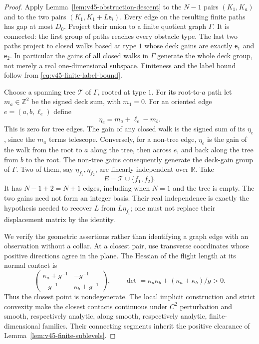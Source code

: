 \begin{proof}
Apply Lemma~\ref{lem:v45-obstruction-descent} to the $N-1$ pairs
$(K_1,K_a)$ and to the two pairs $(K_1,K_1+L\mathsf e_i)$.
Every edge on the resulting finite paths has gap at most $D_0$.
Project their union to a finite quotient graph $\Gamma$.  It is connected:
the first group of paths reaches every obstacle type.  The last two paths
project to closed walks based at type $1$ whose deck gains are exactly
$\mathsf e_1$ and $\mathsf e_2$.  In particular the gains of all closed
walks in $\Gamma$ generate the whole deck group, not merely a real
one-dimensional subspace.  Finiteness and the label bound follow from
\eqref{eq:v45-finite-label-bound}.

Choose a spanning tree $\mathcal T$ of $\Gamma$, rooted at type $1$.
For its root-to-$a$ path let $m_a\in\mathbb Z^2$ be the signed deck sum,
with $m_1=0$.  For an oriented edge $e=(a,b,\ell_e)$ define
\begin{equation}\label{eq:v45-fundamental-gain}
                       \eta_e=m_a+\ell_e-m_b.
\end{equation}
This is zero for tree edges.  The gain of any closed walk is the signed
sum of its $\eta_e$, since the $m_a$ terms telescope.  Conversely, for a
non-tree edge, $\eta_e$ is the gain of the walk from the root to $a$ along
the tree, then across $e$, and back along the tree from $b$ to the root.
The non-tree gains consequently generate the deck-gain group of $\Gamma$.
Two of them, say $\eta_{f_1},\eta_{f_2}$, are linearly independent over
$\mathbb R$.  Take
\[
                       E=\mathcal T\cup\{f_1,f_2\}.
\]
It has $N-1+2=N+1$ edges, including when $N=1$ and the tree is empty.
The two gains need not form an integer basis.  Their real independence is
exactly the hypothesis needed to recover $L$ from $L\eta_{f_i}$; one must
not replace their displacement matrix by the identity.

We verify the geometric assertions rather than identifying a graph edge
with an observation without a collar.  At a closest pair, use transverse
coordinates whose positive directions agree in the plane.  The Hessian of
the flight length at its normal contact is
\begin{equation}\label{eq:v45-contact-hessian}
 \begin{pmatrix}\kappa_a+g^{-1}&-g^{-1}\\-g^{-1}&\kappa_b+g^{-1}\end{pmatrix},
 \qquad
 \det=\kappa_a\kappa_b+(\kappa_a+\kappa_b)/g>0.
\end{equation}
Thus the closest point is nondegenerate.  The local implicit construction
and strict convexity make the closest contacts continuous under $C^2$
perturbation and smooth, respectively analytic, along smooth, respectively
analytic, finite-dimensional families.  Their connecting segments inherit
the positive clearance of Lemma~\ref{lem:v45-finite-sublevels}.


\end{proof}
